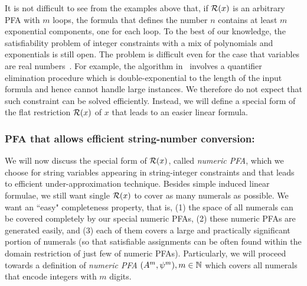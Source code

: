 \documentclass[sigplan,screen]{acmart}
\begin{document}
It is not difficult to see from the examples above that, if $\mathcal{R}(x)$ is an arbitrary PFA with $m$ loops, the formula that defines the number $n$ contains at least $m$ exponential components, one for each loop.
To the best of our knowledge, the satisfiability problem of integer constraints with a mix of polynomials and exponentials is still open. The problem is difficult even for the case that variables are real numbers~\cite{GanCDXZ15,GanCLXZ18}. For example, the algorithm in~\cite{kincaid2019closed} involves a quantifier elimination procedure which is double-exponential to the length of the input formula and hence cannot handle large instances. We therefore do not expect that such constraint can be solved efficiently. Instead, we will define a special form of the flat restriction $\mathcal{R}(x)$ of $x$ that leads to an easier linear formula.

\subsubsection*{PFA that allows efficient string-number conversion: } 
We will now discuss the special form of $\mathcal{R}(x)$, called \emph{numeric PFA}, which we choose for string variables appearing in string-integer constraints and that leads to efficient under-approximation technique.
%
Besides simple induced linear formulae, we still want single $\mathcal{R}(x)$ to cover as many numerals as possible.
We want an ``easy" completeness property, that is,  (1) the space of all numerals can be covered completely by our special numeric PFAs, (2) these numeric PFAs are generated easily, and (3) each of them covers a large and practically significant portion of numerals (so that satisfiable assignments can be often found within the domain restriction of just few of numeric PFAs).
%
Particularly, we will proceed towards a definition of \emph{numeric PFA} $(A^m,\psi^m),m\in\mathbb{N}$ which covers all numerals that encode integers with $m$ digits.
\end{document}
